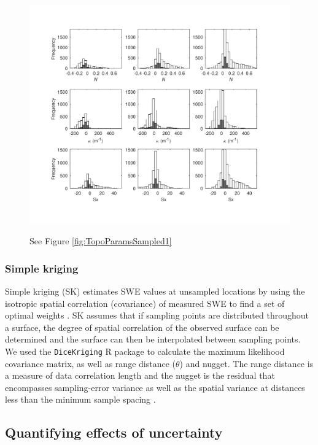 \documentclass[twocolumn, letterpaper]{igs}
\begin{document}
\begin{figure}
	\centering
	\includegraphics[width =\textwidth]{TopoParamsSampled2.pdf}\\
	\caption{See Figure \ref{fig:TopoParamsSampled1}}
	\label{fig:TopoParamsSampled2}
\end{figure}

\subsubsection{Simple kriging}

Simple kriging (SK) estimates SWE values at unsampled locations by using the isotropic spatial correlation (covariance) of measured SWE to find a set of optimal weights \citep{Davis1986, Li2008}. SK assumes that if sampling points are distributed throughout a surface, the degree of spatial correlation of the observed surface can be determined and the surface can then be interpolated between sampling points. We used the \texttt{DiceKriging} R package \citep{Roustant2012} to calculate the maximum likelihood covariance matrix, as well as range distance ($\theta$) and nugget. The range distance is a measure of data correlation length and the nugget is the residual that encompasses sampling-error variance as well as the spatial variance at distances less than the minimum sample spacing \citep{Li2008}. 

\subsection{Quantifying effects of uncertainty}
\end{document}
